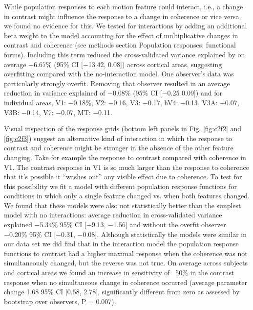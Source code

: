 While population responses to each motion feature could interact, i.e., a change in contrast might influence the response to a change in coherence or vice versa, we found no evidence for this. We tested for interactions by adding an additional beta weight to the model accounting for the effect of multiplicative changes in contrast and coherence (see methods section Population responses: functional forms). Including this term reduced the cross-validated variance explained by on average −6.67\% (95\% CI [−13.42, 0.08]) across cortical areas, suggesting overfitting compared with the no-interaction model. One observer’s data was particularly strongly overfit. Removing that observer resulted in an average reduction in variance explained of −0.08\% (95\% CI [−0.25 0.09]) and for individual areas, V1: −0.18\%, V2: −0.16, V3: −0.17, hV4: −0.13, V3A: −0.07, V3B: −0.14, V7: −0.07, MT: −0.11.

Visual inspection of the response grids (bottom left panels in Fig. \ref{fig:c2f2} and \ref{fig:c2f3}) suggest an alternative kind of interaction in which the response to contrast and coherence might be stronger in the absence of the other feature changing. Take for example the response to contrast compared with coherence in V1. The contrast response in V1 is so much larger than the response to coherence that it’s possible it ``washes out'' any visible effect due to coherence. To test for this possibility we fit a model with different population response functions for conditions in which only a single feature changed vs. when both features changed. We found that these models were also not statistically better than the simplest model with no interactions: average reduction in cross-validated variance explained −5.34\% 95\% CI [−9.13, −1.56] and without the overfit observer −0.20\% 95\% CI [−0.31, −0.08]. Although statistically the models were similar in our data set we did find that in the interaction model the population response functions to contrast had a higher maximal response when the coherence was not simultaneously changed, but the reverse was not true. On average across subjects and cortical areas we found an increase in sensitivity of ~50\% in the contrast response when no simultaneous change in coherence occurred (average parameter change 1.68 95\% CI [0.58, 2.78], significantly different from zero as assessed by bootstrap over observers, P = 0.007).

